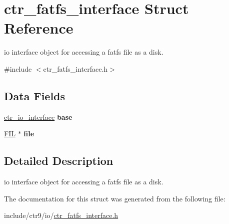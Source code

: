 \hypertarget{structctr__fatfs__interface}{}\section{ctr\+\_\+fatfs\+\_\+interface Struct Reference}
\label{structctr__fatfs__interface}


io interface object for accessing a fatfs file as a disk.  




{\ttfamily \#include $<$ctr\+\_\+fatfs\+\_\+interface.\+h$>$}

\subsection*{Data Fields}
\begin{DoxyCompactItemize}
\item 
\hyperlink{structctr__io__interface}{ctr\+\_\+io\+\_\+interface} {\bfseries base}\hypertarget{structctr__fatfs__interface_aa143d763c2909cd8039f99b414762d54}{}\label{structctr__fatfs__interface_aa143d763c2909cd8039f99b414762d54}

\item 
\hyperlink{struct_f_i_l}{F\+IL} $\ast$ {\bfseries file}\hypertarget{structctr__fatfs__interface_afab52962e7e9df22301c53edd2180c2b}{}\label{structctr__fatfs__interface_afab52962e7e9df22301c53edd2180c2b}

\end{DoxyCompactItemize}


\subsection{Detailed Description}
io interface object for accessing a fatfs file as a disk. 

The documentation for this struct was generated from the following file\+:\begin{DoxyCompactItemize}
\item 
include/ctr9/io/\hyperlink{ctr__fatfs__interface_8h}{ctr\+\_\+fatfs\+\_\+interface.\+h}\end{DoxyCompactItemize}
